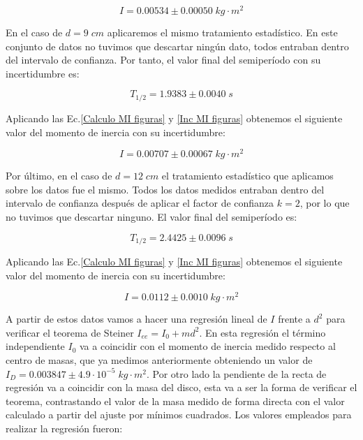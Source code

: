\documentclass[a4paper,12pt,titlepage]{report}
\begin{document}
\begin{equation}
    I = 0.00534 \pm 0.00050 \; kg \cdot m^2
\end{equation}

En el caso de $d=9 \; cm$ aplicaremos el mismo tratamiento estadístico. En este conjunto de datos no tuvimos que descartar ningún dato, todos entraban dentro del intervalo de confianza. Por tanto, el valor final del semiperíodo con su incertidumbre es:

\begin{equation}
    T_{1/2} = 1.9383 \pm 0.0040 \; s
\end{equation}

Aplicando las Ec.\ref{Calculo MI figuras} y \ref{Inc MI figuras} obtenemos el siguiente valor del momento de inercia con su incertidumbre:

\begin{equation}
    I = 0.00707 \pm 0.00067 \; kg \cdot m^2
\end{equation}

Por último, en el caso de $d=12 \; cm$ el tratamiento estadístico que aplicamos sobre los datos fue el mismo. Todos los datos medidos entraban dentro del intervalo de confianza después de aplicar el factor de confianza $k=2$, por lo que no tuvimos que descartar ninguno. El valor final del semiperíodo es:

\begin{equation}
    T_{1/2} = 2.4425 \pm 0.0096 \; s
\end{equation}

Aplicando las Ec.\ref{Calculo MI figuras} y \ref{Inc MI figuras} obtenemos el siguiente valor del momento de inercia con su incertidumbre:

\begin{equation}
    I = 0.0112 \pm 0.0010 \; kg \cdot m^2
\end{equation}

A partir de estos datos vamos a hacer una regresión lineal de $I$ frente a $d^2$ para verificar el teorema de Steiner $I_{ee} = I_0 + md^2$. En esta regresión el término independiente $I_0$ va a coincidir con el momento de inercia medido respecto al centro de masas, que ya medimos anteriormente obteniendo un valor de $I_D = 0.003847 \pm 4.9 \cdot 10^{-5} \; kg\cdot m^2$. Por otro lado la pendiente de la recta de regresión va a coincidir con la masa del disco, esta va a ser la forma de verificar el teorema, contrastando el valor de la masa medido de forma directa con el valor calculado a partir del ajuste por mínimos cuadrados. Los valores empleados para realizar la regresión fueron:
\end{document}
